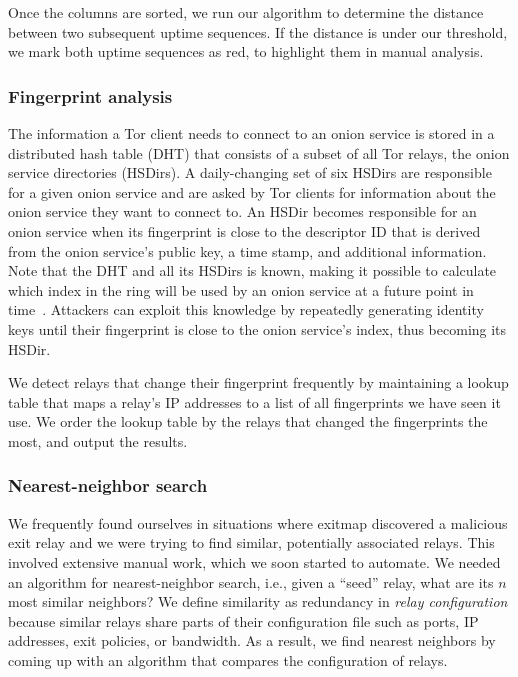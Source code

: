 Once the columns are sorted, we run our algorithm to determine the distance
between two subsequent uptime sequences.  If the distance is under our
threshold, we mark both uptime sequences as red, to highlight them in manual
analysis.

\subsubsection{Fingerprint analysis}
\label{sec:fingerprint-analysis}
The information a Tor client needs to connect to an onion service is stored in a
distributed hash table (DHT) that consists of a subset of all Tor
relays, the onion service directories (HSDirs).  A daily-changing set of six
HSDirs are responsible for a given onion service and are asked by Tor clients
for information about the onion service they want to connect to.  An HSDir
becomes responsible for an onion service when its fingerprint is close to the
descriptor ID that is derived from the onion service's public key, a time stamp,
and additional information.
Note that the DHT and all its HSDirs is known, making it possible to calculate
which index in the ring will be used by an onion service at a future point in
time~\cite{Biryukov2013a}.  Attackers can exploit this knowledge by repeatedly
generating identity keys until their fingerprint is close to the onion service's
index, thus becoming its HSDir.

We detect relays that change their fingerprint frequently by maintaining a
lookup table that maps a relay's IP addresses to a list of all fingerprints we
have seen it use.  We order the lookup table by the relays that changed the
fingerprints the most, and output the results.

\subsubsection{Nearest-neighbor search}
\label{sec:nearest-neighbor}
We frequently found ourselves in situations where exitmap discovered a malicious
exit relay and we were trying to find similar, potentially associated relays.
This involved extensive manual work, which we soon started to automate.  We
needed an algorithm for nearest-neighbor search, i.e., given a ``seed'' relay,
what are its $n$ most similar neighbors?  We define similarity as redundancy in
\emph{relay configuration} because similar relays share parts of their
configuration file such as ports, IP addresses, exit policies, or bandwidth.  As
a result, we find nearest neighbors by coming up with an algorithm that compares
the configuration of relays.

